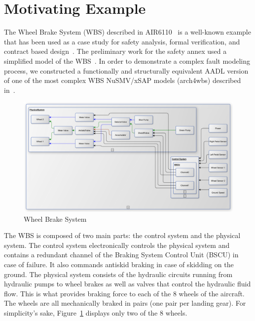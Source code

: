 \section{Motivating Example}
\label{sec:case_study} 


The Wheel Brake System (WBS) described in AIR6110~\cite{AIR6110} is a well-known example that has been used as a case study for safety analysis, formal verification, and contract based design~\cite{DBLP:conf/cav/BozzanoCPJKPRT15, 10.1007/978-3-319-11936-6-7, CAV2015:BoCiGrMa, Joshi05:SafeComp}. The preliminary work for the safety annex used a simplified model of the WBS~\cite{Stewart17:IMBSA}. In order to demonstrate a complex fault modeling process, we constructed a functionally and structurally equivalent AADL version of one of the most complex WBS NuSMV/xSAP models (arch4wbs) described in~\cite{DBLP:conf/cav/BozzanoCPJKPRT15}.    

\begin{figure}[h!]
	\centering
	\includegraphics[trim=0 9 0 5,clip,width=\textwidth]{images/wbs_arch.pdf}
	\caption{Wheel Brake System}
	\label{fig:wbs}
\end{figure} 

The WBS is composed of two main parts: the control system and the physical system. The control system electronically controls the physical system and contains a redundant channel of the Braking System Control Unit (BSCU) in case of failure. It also commands antiskid braking in case of skidding on the ground. The physical system consists of the hydraulic circuits running from hydraulic pumps to wheel brakes as well as valves that control the hydraulic fluid flow. This is what provides braking force to each of the 8 wheels of the aircraft. The wheels are all mechanically braked in pairs (one pair per landing gear). For simplicity's sake, Figure~\ref{fig:wbs} displays only two of the 8 wheels. 

